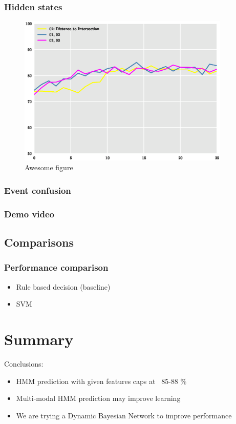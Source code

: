\documentclass{beamer}
\begin{document}
\begin{frame}

\frametitle{Hidden states}
	\begin{figure}
 		\centering
    	\includegraphics[width =
    	0.9\textwidth]{./presentation_files/hmm_state_comparison.eps}
    	\caption{Awesome figure}
	\end{figure}
\end{frame}



\begin{frame}

\frametitle{Event confusion}

\end{frame}

\begin{frame}

\frametitle{Demo video}

\end{frame}

\subsection[Comparisons]{Comparisons}
\begin{frame}
\frametitle{Performance comparison}
\begin{itemize}
  \item Rule based decision (baseline)
  \item SVM
\end{itemize}

\end{frame}

\section{Summary}
\begin{frame}
	Conclusions:
	\begin{itemize}
	  \item HMM prediction with given features caps at ~85-88 \%
	  \item Multi-modal HMM prediction may improve learning
	  \item We are trying a Dynamic Bayesian Network to improve performance
	\end{itemize}
\end{frame}
\end{document}
